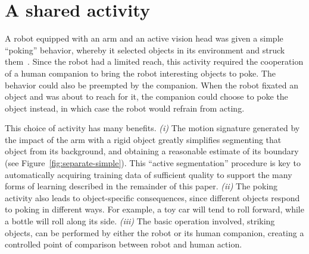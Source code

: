 \section{A shared activity}

A robot equipped with an arm and an active vision head was given a
simple ``poking'' behavior, whereby it selected objects in its
environment and struck them~\citep{fitzpatrick02towards}.
Since the robot had a limited reach,
this activity required the cooperation of a human
companion to bring the robot interesting objects to poke.
The behavior could also be preempted by the companion.  When the robot
fixated an object and was about to reach for it, the companion
could choose to poke the object instead, in which case the robot
would refrain from acting.

This choice of activity has many benefits.  
%
{\em (i)}
The motion signature
generated by the impact of the arm with a rigid object greatly
simplifies segmenting that object from its background, and obtaining a
reasonable estimate of its boundary (see
Figure~\ref{fig:separate-simple}).  
This ``active segmentation''
procedure is key to automatically acquiring training data of
sufficient quality to support the many forms of learning described in
the remainder of this paper.
%
{\em (ii)}
The poking activity also leads to object-specific consequences, since
different objects respond to poking in different ways.  For example,
a toy car will tend to roll forward, while a bottle will roll along its
side.
%
{\em (iii)}
The basic operation involved, striking objects, can be performed
by either the robot or its human companion, creating a
controlled point of 
comparison between robot and human action.


%




